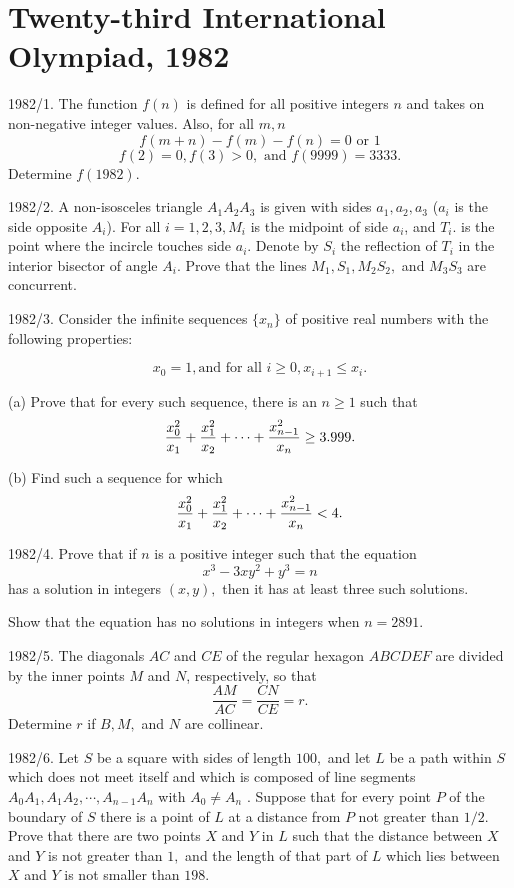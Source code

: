 \documentclass[12pt,thmsa]{article}
\begin{document}
\section{Twenty-third International Olympiad, 1982}

1982/1. The function $f(n)$ is defined for all positive integers $n$ and
takes on non-negative integer values. Also, for all $m,n$%
\[
f(m+n)-f(m)-f(n)=0\text{ or }1 
\]
\[
f(2)=0,f(3)>0,\text{ and }f(9999)=3333. 
\]
Determine $f(1982).$

1982/2. A non-isosceles triangle $A_{1}A_{2}A_{3}$ is given with sides $%
a_{1},a_{2},a_{3}$ ($a_{i}$ is the side opposite $A_{i}$). For all $%
i=1,2,3,M_{i}$ is the midpoint of side $a_{i}$, and $T_{i}$. is the point
where the incircle touches side $a_{i}$. Denote by $S_{i}$ the reflection of 
$T_{i}$ in the interior bisector of angle $A_{i}$. Prove that the lines $%
M_{1},S_{1},M_{2}S_{2},$ and $M_{3}S_{3}$ are concurrent.

1982/3. Consider the infinite sequences $\{x_{n}\}$ of positive real numbers
with the following properties:

\[
x_{0}=1,\text{and for all }i\ge 0,x_{i+1}\le x_{i}. 
\]

(a) Prove that for every such sequence, there is an $n\ge 1$ such that 
\[
\frac{x_{0}^{2}}{x_{1}}+\frac{x_{1}^{2}}{x_{2}}+\cdots +\frac{x_{n-1}^{2}}{%
x_{n}}\ge 3.999. 
\]

(b) Find such a sequence for which 
\[
\frac{x_{0}^{2}}{x_{1}}+\frac{x_{1}^{2}}{x_{2}}+\cdots +\frac{x_{n-1}^{2}}{%
x_{n}}<4. 
\]

1982/4. Prove that if $n$ is a positive integer such that the equation 
\[
x^{3}-3xy^{2}+y^{3}=n 
\]
has a solution in integers $(x,y),$ then it has at least three such
solutions.

Show that the equation has no solutions in integers when $n=2891.$

1982/5. The diagonals $AC$ and $CE$ of the regular hexagon $ABCDEF$ are
divided by the inner points $M$ and $N$, respectively, so that 
\[
\frac{AM}{AC}=\frac{CN}{CE}=r. 
\]
Determine $r$ if $B,M,$ and $N$ are collinear.

1982/6. Let $S$ be a square with sides of length $100,$ and let $L$ be a
path within $S$ which does not meet itself and which is composed of line
segments $A_{0}A_{1},A_{1}A_{2},\cdots ,A_{n-1}A_{n}$ with $A_{0}\neq A_{n}$%
. Suppose that for every point $P$ of the boundary of $S$ there is a point
of $L$ at a distance from $P$ not greater than $1/2.$ Prove that there are
two points $X$ and $Y$ in $L$ such that the distance between $X$ and $Y$ is
not greater than $1,$ and the length of that part of $L$ which lies between $%
X$ and $Y$ is not smaller than $198.$
\end{document}
